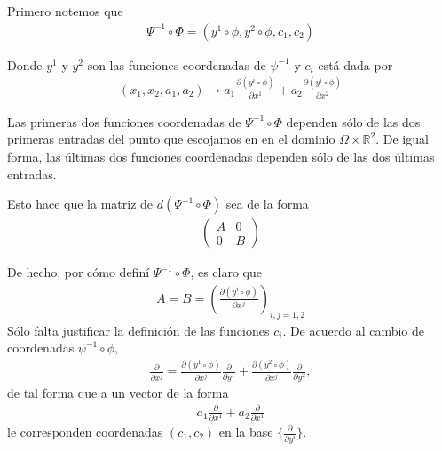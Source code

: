 \documentclass[11pt]{article}
\begin{document}
Primero notemos que 
\begin{align*}
\Psi^{-1}\circ\Phi=(y^1\circ\phi,y^2\circ\phi,c_1,c_2)
\end{align*}
\par Donde $y^1$ y $y^2$ son las funciones coordenadas de $\psi^{-1}$ y $c_i$ está dada por
\begin{align*}
(x_1,x_2,a_1,a_2)\mapsto a_1\frac{\partial (y^i\circ \phi)}{\partial x^1}+a_2\frac{\partial (y^i\circ \phi)}{\partial x^2}
\end{align*}
\par Las primeras dos funciones coordenadas de $\Psi^{-1}\circ\Phi$ dependen sólo de las dos primeras entradas del punto que escojamos en en el dominio $\Omega\times\mathbb{R}^2$. De igual forma, las últimas dos funciones coordenadas dependen sólo de las dos últimas entradas.\par
Esto hace que la matriz de $d(\Psi^{-1}\circ\Phi)$ sea de la forma 
\begin{align*}
\begin{pmatrix}
A & 0 \\
0 & B
\end{pmatrix}
\end{align*}
\par De hecho, por cómo definí $\Psi^{-1}\circ\Phi$, es claro que
\begin{align*}
A=B=\left(\frac{\partial (y^i\circ \phi)}{\partial x^j}\right)_{i,j=1,2}
\end{align*}
Sólo falta justificar la definición de las funciones $c_i$. De acuerdo al cambio de coordenadas $\psi^{-1}\circ\phi$,
\begin{align*}
\frac{\partial}{\partial x^j}=\frac{\partial (y^1\circ \phi)}{\partial x^j}\frac{\partial}{\partial y^1}+\frac{\partial (y^2\circ \phi)}{\partial x^j}\frac{\partial}{\partial y^2},
\end{align*}
de tal forma que a un vector de la forma
\begin{align*}
 a_1\frac{\partial}{\partial x^1}+a_2\frac{\partial}{\partial x^1}
\end{align*}
le corresponden coordenadas $(c_1,c_2)$ en la base $\big\{ \frac{\partial}{\partial y^i}\big\}$.
\newpage
\end{document}
